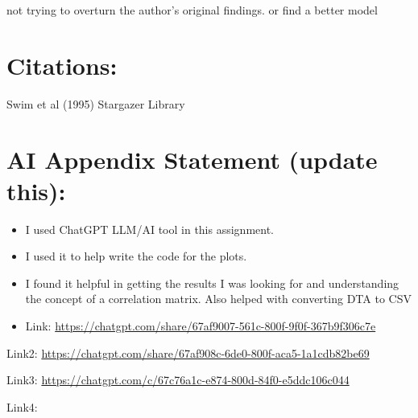 \documentclass[
  letterpaper,
  DIV=11,
  numbers=noendperiod]{scrartcl}
\begin{document}
not trying to overturn the author's original findings. or find a better
model

\section{Citations:}\label{citations}

Swim et al (1995) Stargazer Library

\section{AI Appendix Statement (update
this):}\label{ai-appendix-statement-update-this}

\begin{itemize}
\item
  I used ChatGPT LLM/AI tool in this assignment.
\item
  I used it to help write the code for the plots. ~
\item
  I found it helpful in getting the results I was looking for and
  understanding the concept of a correlation matrix. Also helped with
  converting DTA to CSV
\item
  Link:
  \url{https://chatgpt.com/share/67af9007-561c-800f-9f0f-367b9f306c7e}
\end{itemize}

Link2:
\url{https://chatgpt.com/share/67af908c-6de0-800f-aca5-1a1cdb82be69}

Link3: \url{https://chatgpt.com/c/67c76a1c-e874-800d-84f0-e5ddc106c044}

Link4:\\
\end{document}
